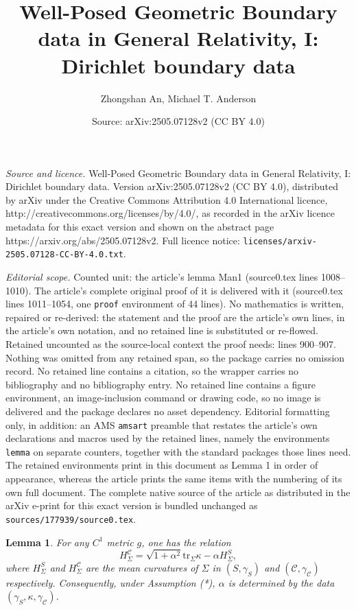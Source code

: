 \documentclass[10pt,a4paper]{amsart}
\title{Well-Posed Geometric Boundary data in General Relativity, I: Dirichlet boundary data}
\author{Zhongshan An, Michael T. Anderson}
\date{Source: arXiv:2505.07128v2 (CC BY 4.0)}
\newtheorem{lemma}{Lemma}
\newcommand{\Si}{\Sigma}
\renewcommand{\a}{\alpha}
\newcommand{\be}{\begin{equation}}
\newcommand{\cC}{{\mathcal C}}
\newcommand{\ee}{\end{equation}}
\newcommand{\g}{\gamma}
\renewcommand{\k}{\kappa}
\newcommand{\tr}{\mathrm{tr}}
\begin{document}
\maketitle

\noindent\emph{Source and licence.} Well-Posed Geometric Boundary data in General Relativity, I: Dirichlet boundary data. Version arXiv:2505.07128v2 (CC BY 4.0), distributed by arXiv under the Creative Commons Attribution 4.0 International licence, http://creativecommons.org/licenses/by/4.0/, as recorded in the arXiv licence metadata for this exact version and shown on the abstract page https://arxiv.org/abs/2505.07128v2. Full licence notice: \texttt{licenses/arxiv-2505.07128-CC-BY-4.0.txt}.\par\smallskip

\noindent\textit{Editorial scope.} Counted unit: the article's lemma Man1 (source0.tex lines 1008--1010). The article's complete original proof of it is delivered with it (source0.tex lines 1011--1054, one \texttt{proof} environment of 44 lines). No mathematics is written, repaired or re-derived: the statement and the proof are the article's own lines, in the article's own notation, and no retained line is substituted or re-flowed.  Retained uncounted as the source-local context the proof needs: lines 900--907.  Nothing was omitted from any retained span, so the package carries no omission record.  No retained line contains a citation, so the wrapper carries no bibliography and no bibliography entry.  No retained line contains a figure environment, an image-inclusion command or drawing code, so no image is delivered and the package declares no asset dependency.  Editorial formatting only, in addition: an AMS \texttt{amsart} preamble that restates the article's own declarations and macros used by the retained lines, namely the environments \texttt{lemma} on separate counters, together with the standard packages those lines need.  The retained environments print in this document as Lemma 1 in order of appearance, whereas the article prints the same items with the numbering of its own full document.  The complete native source of the article as distributed in the arXiv e-print for this exact version is bundled unchanged as \texttt{sources/177939/source0.tex}.
\begin{lemma}\label{alpha}
For any $C^1$ metric $g$, one has the relation 
\be \label{vel}
H_{\Si}^{\cC} = \sqrt{1+\a^2}\tr_\Si \k - \a H_\Si^S,
\ee
where $H_{\Si}^S$ and $H_{\Si}^{\cC}$ are the mean curvatures of $\Si$ in $(S, \g_S)$ and $(\cC, \g_{\cC})$ respectively. 
Consequently, under Assumption (*), $\a$ is determined by the data $(\g_S, \k, \g_{\cC})$. 
\end{lemma}
\end{document}
